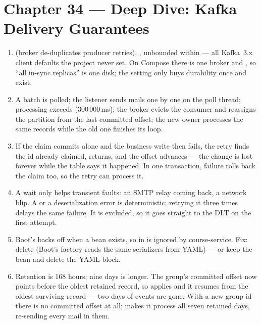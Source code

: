 \section*{Chapter 34 --- Deep Dive: Kafka Delivery Guarantees}
\begin{enumerate}
  \item {} (broker de-duplicates producer
  retries), , unbounded  within
   --- all Kafka~3.x client defaults the
  project never set. On Compose there is one broker and
  , so ``all in-sync replicas'' is one disk; the
  setting only buys durability once  and
   exist.
  \item A batch is polled; the listener sends mails one by one on the
  poll thread; processing exceeds 
  (300\,000\,ms); the broker evicts the consumer and reassigns the
  partition from the last committed offset; the new owner processes
  the same records while the old one finishes its loop.
  \item If the claim commits alone and the business write then fails,
  the retry finds the id already claimed, returns, and the offset
  advances --- the change is lost forever while the table says it
  happened. In one transaction, failure rolls back the claim too, so
  the retry can process it.
  \item A wait only helps transient faults: an SMTP relay coming back,
  a network blip. A  or a deserialization
  error is deterministic; retrying it three times delays the same
  failure. It is excluded, so it goes straight to the DLT on the first
  attempt.
  \item Boot's  backs off when a
   bean exists, so 
  in  is ignored by course-service. Fix:
  delete  (Boot's factory reads the same
  serializers from YAML) --- or keep the bean and delete the YAML block.
  \item Retention is 168 hours; nine days is longer. The group's
  committed offset now points before the oldest retained record, so
   applies and it resumes from the
  oldest surviving record --- two days of events are gone. With a new
  group id there is no committed offset at all;  makes
  it process all seven retained days, re-sending every mail in them.
\end{enumerate}


